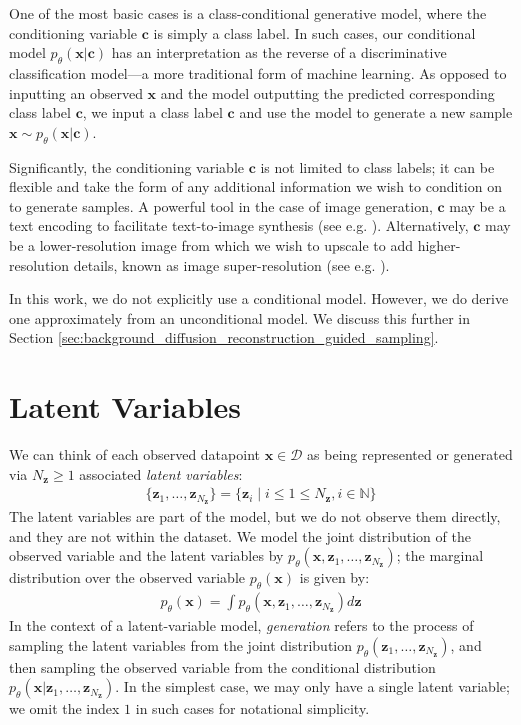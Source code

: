 \documentclass[ oneside,%
                    author={George Herbert},
                    degree={MSci},
                     title={Video Diffusion Models for Climate Simulations},
                  subtitle={}]{dissertation}
\begin{document}
One of the most basic cases is a class-conditional generative model, where the conditioning variable $\mathbf{c}$ is simply a class label. In such cases, our conditional model $p_\theta(\mathbf{x}|\mathbf{c})$ has an interpretation as the reverse of a discriminative classification model---a more traditional form of machine learning. As opposed to inputting an observed $\mathbf{x}$ and the model outputting the predicted corresponding class label $\mathbf{c}$, we input a class label $\mathbf{c}$ and use the model to generate a new sample $\mathbf{x}\sim p_\theta(\mathbf{x}|\mathbf{c})$.

Significantly, the conditioning variable $\mathbf{c}$ is not limited to class labels; it can be flexible and take the form of any additional information we wish to condition on to generate samples. A powerful tool in the case of image generation, $\mathbf{c}$ may be a text encoding to facilitate text-to-image synthesis (see e.g. \cite{Imagen_Saharia,Simple_Diffusion_Hoogeboom}). Alternatively, $\mathbf{c}$ may be a lower-resolution image from which we wish to upscale to add higher-resolution details, known as image super-resolution (see e.g. \cite{Cascaded_Ho}).

In this work, we do not explicitly use a conditional model. However, we do derive one approximately from an unconditional model. We discuss this further in Section \ref{sec:background_diffusion_reconstruction_guided_sampling}.

\section{Latent Variables}
\label{sec:background_latent}

We can think of each observed datapoint $\mathbf{x}\in\mathcal{D}$ as being represented or generated via $N_{\mathbf{z}}\ge 1$ associated \textit{latent variables}:
\begin{align}
      \{\mathbf{z}_1,\ldots,\mathbf{z}_{N_\mathbf{z}}\} = \{\mathbf{z}_i \mid i \le 1 \le N_{\mathbf{z}}, i \in \mathbb{N} \}
\end{align}
The latent variables are part of the model, but we do not observe them directly, and they are not within the dataset. We model the joint distribution of the observed variable and the latent variables by $p_\theta(\mathbf{x},\mathbf{z}_1,\ldots,\mathbf{z}_{N_\mathbf{z}})$; the marginal distribution over the observed variable $p_\theta(\mathbf{x})$ is given by:
\begin{align}
      p_\theta(\mathbf{x})=\int p_\theta(\mathbf{x},\mathbf{z}_1,\ldots,\mathbf{z}_{N_\mathbf{z}}) d\mathbf{z}
\end{align}
In the context of a latent-variable model, \textit{generation} refers to the process of sampling the latent variables from the joint distribution $p_\theta(\mathbf{z}_1,\ldots,\mathbf{z}_{N_\mathbf{z}})$, and then sampling the observed variable from the conditional distribution $p_\theta(\mathbf{x}|\mathbf{z}_1,\ldots,\mathbf{z}_{N_\mathbf{z}})$. In the simplest case, we may only have a single latent variable; we omit the index $1$ in such cases for notational simplicity.
\end{document}
